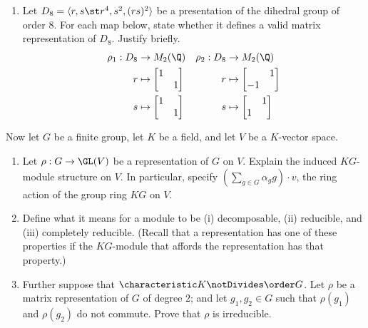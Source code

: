 \begin{enumerate}[label=(\alph*)]
\item\label{itm : e03q4a} Let $D_{8} = \langle{}r, s \st r^{4}, s^{2}, (r s)^{2}\rangle{}$ be a presentation of the dihedral group of order $8$. For each map below, state whether it defines a valid matrix representation of $D_{8}$. Justify briefly.
\begin{align*}
\rho_{1}
:
D_{8}
&\rightarrow
M_{2}(\Q)
&
\rho_{2}
:
D_{8}
&\rightarrow
M_{2}(\Q)
\\
r
&\mapsto
\begin{bmatrix}
1	&		\\
	&	1
\end{bmatrix}
&
r
&\mapsto
\begin{bmatrix}
	&	1	\\
-1	&	
\end{bmatrix}
\\
s
&\mapsto
\begin{bmatrix}
1	&		\\
	&	1
\end{bmatrix}
&
s
&\mapsto
\begin{bmatrix}
	&	1	\\
1	&	
\end{bmatrix}
\end{align*}
\end{enumerate}
Now let $G$ be a finite group, let $K$ be a field, and let $V$ be a $K$-vector space.
\begin{enumerate}[resume, label=(\alph*)]
\item\label{itm : e03q4b} Let $\rho : G \rightarrow \GL(V)$ be a representation of $G$ on $V$. Explain the induced $K G$-module structure on $V$. In particular, specify $(\sum_{g \in G} \alpha_{g} g) \cdot v$, the ring action of the group ring $K G$ on $V$.
\item\label{itm : e03q4c} Define what it means for a module to be (i) decomposable, (ii) reducible, and (iii) completely reducible. (Recall that a representation has one of these properties if the $K G$-module that affords the representation has that property.)
\item\label{itm : e03q4d} Further suppose that $\characteristic K \notDivides \order G$. Let $\rho$ be a matrix representation of $G$ of degree $2$; and let $g_{1}, g_{2} \in G$ such that $\rho(g_{1})$ and $\rho(g_{2})$ do not commute. Prove that $\rho$ is irreducible.
\end{enumerate}

